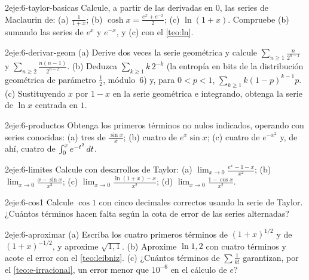 \begin{ejercicio}{2}{eje:6-taylor-basicas}
Calcule, a partir de las derivadas en $0$, las series de Maclaurin de: (a) $\frac{1}{1+x}$; (b) $\cosh x=\frac{e^{x}+e^{-x}}{2}$; (c) $\ln(1+x)$. Compruebe (b) sumando las series de $e^{x}$ y $e^{-x}$, y (c) con el \cref{teo:ln}.
\end{ejercicio}

\begin{ejercicio}{2}{eje:6-derivar-geom}
(a) Derive dos veces la serie geométrica y calcule $\sum_{n\ge1}\frac{n}{2^{n-1}}$ y $\sum_{n\ge2}\frac{n(n-1)}{2^{n-2}}$. (b) Deduzca $\sum_{k\ge1}k\,2^{-k}$ (la entropía en bits de la distribución geométrica de parámetro $\frac12$, módulo~6) y, para $0<p<1$, $\sum_{k\ge1}k(1-p)^{k-1}p$. (c) Sustituyendo $x$ por $1-x$ en la serie geométrica e integrando, obtenga la serie de $\ln x$ centrada en $1$.
\end{ejercicio}

\begin{ejercicio}{2}{eje:6-productos}
Obtenga los primeros términos no nulos indicados, operando con series conocidas: (a) tres de $\frac{\sin x}{x}$; (b) cuatro de $e^{x}\sin x$; (c) cuatro de $e^{-x^{2}}$ y, de ahí, cuatro de $\int_0^{x}e^{-t^{2}}\mathop{}\!d t$.
\end{ejercicio}

\begin{ejercicio}{2}{eje:6-limites}
Calcule con desarrollos de Taylor: (a) $\lim_{x\to0}\frac{e^{x}-1-x}{x^{2}}$; (b) $\lim_{x\to0}\frac{x-\sin x}{x^{3}}$; (c) $\lim_{x\to0}\frac{\ln(1+x)-x}{x^{2}}$; (d) $\lim_{x\to0}\frac{1-\cos x}{x^{2}}$.
\end{ejercicio}

\begin{ejercicio}{2}{eje:6-cos1}
Calcule $\cos1$ con cinco decimales correctos usando la serie de Taylor. ¿Cuántos términos hacen falta según la cota de error de las series alternadas?
\end{ejercicio}

\begin{ejercicio}{2}{eje:6-aproximar}
(a) Escriba los cuatro primeros términos de $(1+x)^{1/2}$ y de $(1+x)^{-1/2}$, y aproxime $\sqrt{1{,}1}$. (b) Aproxime $\ln1{,}2$ con cuatro términos y acote el error con el \cref{teo:leibniz}. (c) ¿Cuántos términos de $\sum\frac{1}{k!}$ garantizan, por el \cref{teo:e-irracional}, un error menor que $10^{-6}$ en el cálculo de $e$?
\end{ejercicio}

